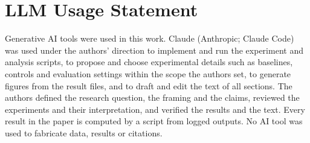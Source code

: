 \section*{LLM Usage Statement}
Generative AI tools were used in this work. Claude (Anthropic; Claude Code) was used under the authors' direction to implement and run the experiment and analysis scripts, to propose and choose experimental details such as baselines, controls and evaluation settings within the scope the authors set, to generate figures from the result files, and to draft and edit the text of all sections. The authors defined the research question, the framing and the claims, reviewed the experiments and their interpretation, and verified the results and the text. Every result in the paper is computed by a script from logged outputs. No AI tool was used to fabricate data, results or citations.
